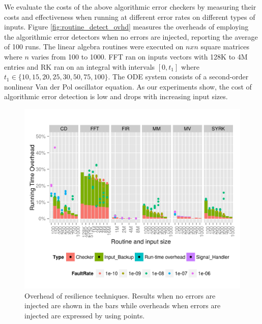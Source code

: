 \documentclass{sig-alternate}
\begin{document}
We evaluate the costs of the above algorithmic error checkers by measuring their costs and effectiveness when running at different error rates on different types of inputs.
Figure \ref{fig:routine_detect_ovhd} measures the overheads of employing the algorithmic error detectors when no errors are injected, reporting the average of 100 runs.
The linear algebra routines were executed on $nxn$ square matrices where $n$ varies from 100 to 1000.
FFT ran on inputs vectors with 128K to 4M entries and RK ran on an integral with intervals $[0, t_1]$ where $t_1 \in \{10, 15, 20, 25, 30, 50, 75, 100\}$. The ODE system consists of a second-order nonlinear Van der Pol oscillator equation.
As our experiments show, the cost of algorithmic error detection is low and drops with increasing input sizes.

\begin{figure}[ht!]
\centering
\includegraphics[width=1.00\columnwidth]{figs/4_1_1_Overall_Breakdown.png}
\caption{Overhead of resilience techniques. Results when no errors are injected are shown in the bars while overheads when errors are injected are expressed by using points.}
\label{fig:routine_all_ovhd}
\end{figure}
\end{document}
